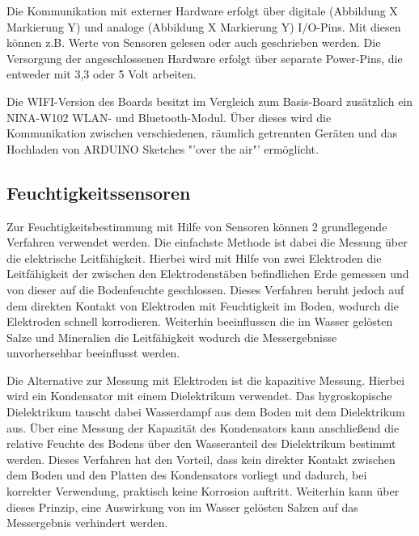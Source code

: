 \documentclass[
    load-dhbw-templates,
    load-preamble = true,
    auto-intro-pages = all,
    add-tocs-to-toc,
    debug = true,
    language = english,
    mainlanguage = ngerman,
    add-bibliography,
    bib-file = dhbw-source.bib,
    biblatex/style = alphabetic, 
]{iodhbwm}
\begin{document}
        Die Kommunikation mit externer Hardware erfolgt über digitale (Abbildung X Markierung Y) und analoge (Abbildung X Markierung Y) I/O-Pins. Mit diesen können z.B. Werte von Sensoren gelesen oder auch geschrieben werden.
        Die Versorgung der angeschlossenen Hardware erfolgt über separate Power-Pins, die entweder mit 3,3 oder 5 Volt arbeiten.
        
        Die WIFI-Version des Boards besitzt im Vergleich zum Basis-Board zusätzlich ein NINA-W102 WLAN- und Bluetooth-Modul. Über dieses wird die Kommunikation zwischen verschiedenen, räumlich getrennten Geräten und das Hochladen von ARDUINO Sketches "'over the air"' ermöglicht.

        \subsection{Feuchtigkeitssensoren}

        Zur Feuchtigkeitsbestimmung mit Hilfe von Sensoren können 2 grundlegende Verfahren verwendet werden. Die einfachste Methode ist dabei die Messung über die elektrische Leitfähigkeit. Hierbei wird mit Hilfe von zwei Elektroden die Leitfähigkeit der zwischen den Elektrodenstäben befindlichen Erde gemessen und von dieser auf die Bodenfeuchte geschlossen. Dieses Verfahren beruht jedoch auf dem direkten Kontakt von Elektroden mit Feuchtigkeit im Boden, wodurch die Elektroden schnell korrodieren. Weiterhin beeinflussen die im Wasser gelösten Salze und Mineralien die Leitfähigkeit wodurch die Messergebnisse unvorhersehbar beeinflusst werden. %

        Die Alternative zur Messung mit Elektroden ist die kapazitive Messung.
        Hierbei wird ein Kondensator mit einem Dielektrikum verwendet. Das hygroskopische Dielektrikum tauscht dabei Wasserdampf aus dem Boden mit dem Dielektrikum aus. Über eine Messung der Kapazität des Kondensators kann anschließend die relative Feuchte des Bodens über den Wasseranteil des Dielektrikum bestimmt werden. %
        Dieses Verfahren hat den Vorteil, dass kein direkter Kontakt zwischen dem Boden und den Platten des Kondensators vorliegt und dadurch, bei korrekter Verwendung, praktisch keine Korrosion auftritt.
        Weiterhin kann über dieses Prinzip, eine Auswirkung von im Wasser gelösten Salzen auf das Messergebnis verhindert werden.
\end{document}
